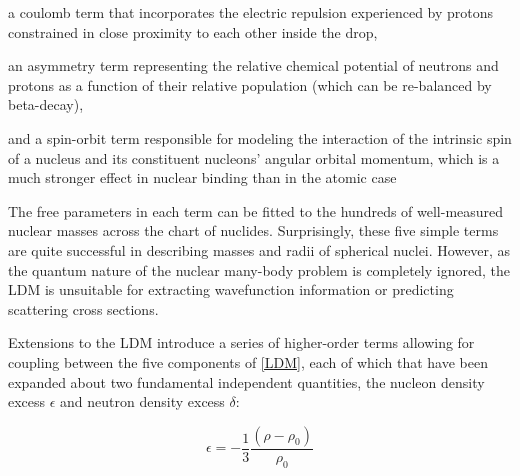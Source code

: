 a coulomb term that incorporates the electric repulsion experienced by protons
constrained in close proximity to each other inside the drop,

an asymmetry term representing the relative chemical potential of neutrons and
protons as a function of their relative population (which can be re-balanced by
beta-decay),

and a spin-orbit term responsible for modeling the interaction of the intrinsic spin
of a nucleus and its constituent nucleons' angular orbital momentum, which is
a much stronger effect in nuclear binding than in the atomic case

The free parameters in each term can be fitted to the hundreds of well-measured nuclear masses
across the chart of nuclides. Surprisingly, these five simple terms are quite successful
in describing masses and radii of spherical nuclei. However, as the quantum
nature of the nuclear many-body problem is completely ignored, the LDM is
unsuitable for extracting wavefunction information or predicting scattering
cross sections.

Extensions to the LDM introduce a series of higher-order terms allowing for coupling
between the five components of \ref{LDM}, each of which that have been expanded about two
fundamental independent quantities, the nucleon density excess $\epsilon$
and neutron density excess $\delta$:

\begin{equation}
    \epsilon = -\frac{1}{3}\frac{(\rho - \rho_{0})}{\rho_{0}}
\end{equation}

